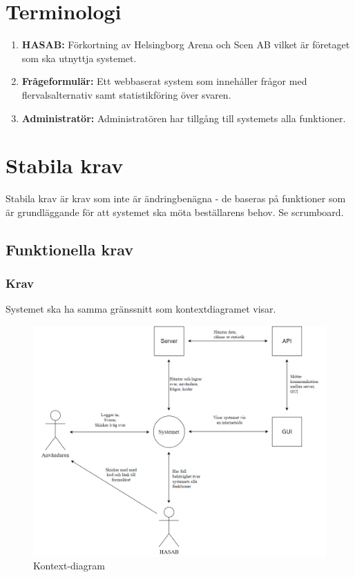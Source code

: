\documentclass{article}
\begin{document}
    \section{Terminologi}
    \begin{enumerate}
        \item \textbf{HASAB:} Förkortning av Helsingborg Arena och Scen AB vilket är företaget som ska utnyttja systemet.
        \item \textbf{Frågeformulär:} Ett webbaserat system som innehåller frågor med flervalsalternativ samt statistikföring över svaren.
        \item \textbf{Administratör:} Administratören har tillgång till systemets alla funktioner.
    \end{enumerate}
    
    \section{Stabila krav}
       Stabila krav är krav som inte är ändringbenägna - de baseras på funktioner som är grundläggande för att systemet ska möta beställarens behov. 
    Se scrumboard.
    
    \subsection{Funktionella krav}
    \subsubsection{Krav}
    Systemet ska ha samma gränssnitt som kontextdiagramet visar.
    
    \begin{figure}[h!]
    \caption{Kontext-diagram}
    \includegraphics[width=150mm]{Kontextdiagram.png}
    
    \end{figure}
    
\end{document}
